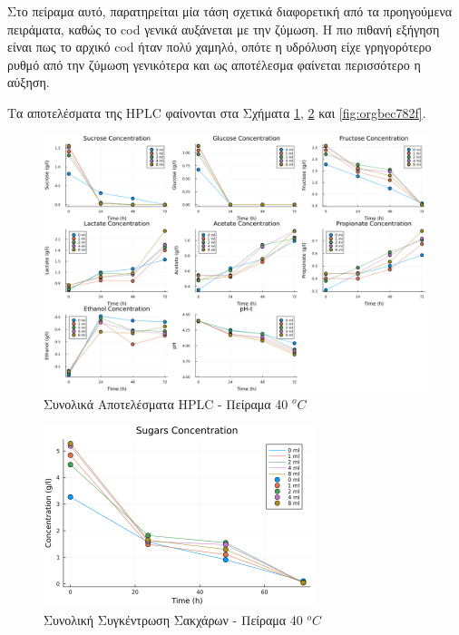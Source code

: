 \documentclass[11pt]{report}
\begin{document}
\begin{enumerate}
Στο πείραμα αυτό, παρατηρείται μία τάση σχετικά διαφορετική από τα προηγούμενα πειράματα, καθώς το \acrshort{cod} γενικά αυξάνεται με την ζύμωση. Η πιο πιθανή εξήγηση είναι πως το αρχικό \acrshort{cod} ήταν πολύ χαμηλό, οπότε η υδρόλυση είχε γρηγορότερο ρυθμό από την ζύμωση γενικότερα και ως αποτέλεσμα φαίνεται περισσότερο η αύξηση.

Τα αποτελέσματα της HPLC φαίνονται στα Σχήματα \ref{fig:org5f51c4f}, \ref{fig:org9f90ad5} και \ref{fig:orgbec782f}.

\begin{figure}[htbp]
\centering
\includegraphics[width=.9\linewidth]{../plots/28_11/final_scatter_28_11.png}
\caption{\label{fig:org5f51c4f}Συνολικά Αποτελέσματα HPLC - Πείραμα 40 \(^oC\)}
\end{figure}

\begin{figure}[htbp]
\centering
\includegraphics[width=300px]{../plots/28_11/sugars_conc_scatter_28_11.png}
\caption{\label{fig:org9f90ad5}Συνολική Συγκέντρωση Σακχάρων - Πείραμα 40 \(^oC\)}
\end{figure}


\end{enumerate}
\end{document}
